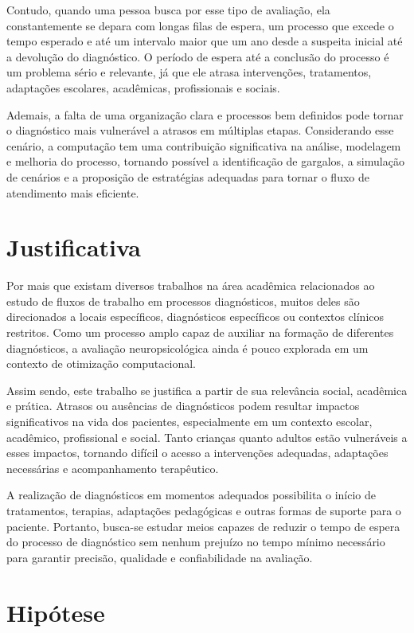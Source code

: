 \documentclass[
    12pt,                %
    openright,           %
    oneside,             %
    a4paper,             %
    english,             %
    brazil               %
]{abntex2}
\begin{document}
Contudo, quando uma pessoa busca por esse tipo de avaliação, ela constantemente se depara com longas filas de espera, um processo que excede o tempo esperado e até um intervalo maior que um ano desde a suspeita inicial até a devolução do diagnóstico. O período de espera até a conclusão do processo é um problema sério e relevante, já que ele atrasa intervenções, tratamentos, adaptações escolares, acadêmicas, profissionais e sociais.

Ademais, a falta de uma organização clara e processos bem definidos pode tornar o diagnóstico mais vulnerável a atrasos em múltiplas etapas. Considerando esse cenário, a computação tem uma contribuição significativa na análise, modelagem e melhoria do processo, tornando possível a identificação de gargalos, a simulação de cenários e a proposição de estratégias adequadas para tornar o fluxo de atendimento mais eficiente.

\section{Justificativa}

Por mais que existam diversos trabalhos na área acadêmica relacionados ao estudo de fluxos de trabalho em processos diagnósticos, muitos deles são direcionados a locais específicos, diagnósticos específicos ou contextos clínicos restritos. Como um processo amplo capaz de auxiliar na formação de diferentes diagnósticos, a avaliação neuropsicológica ainda é pouco explorada em um contexto de otimização computacional. 

Assim sendo, este trabalho se justifica a partir de sua relevância social, acadêmica e prática. Atrasos ou ausências de diagnósticos podem resultar impactos significativos na vida dos pacientes, especialmente em um contexto escolar, acadêmico, profissional e social. Tanto crianças quanto adultos estão vulneráveis a esses impactos, tornando difícil o acesso a intervenções adequadas, adaptações necessárias e acompanhamento terapêutico.

A realização de diagnósticos em momentos adequados possibilita o início de tratamentos, terapias, adaptações pedagógicas e outras formas de suporte para o paciente. Portanto, busca-se estudar meios capazes de reduzir o tempo de espera do processo de diagnóstico sem nenhum prejuízo no tempo mínimo necessário para garantir precisão, qualidade e confiabilidade na avaliação.

\section{Hipótese}
\end{document}
